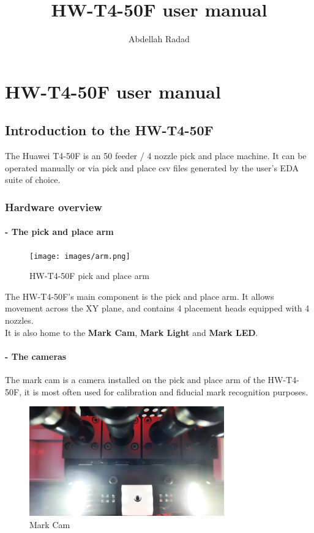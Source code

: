 \documentclass[a4paper,10pt]{report}
\title{HW-T4-50F user manual}
\author{Abdellah Radad}
\begin{document}

\newpage
\tableofcontents
\newpage
\listoffigures
\newpage
\chapter{HW-T4-50F user manual}
\newpage
\section{Introduction to the HW-T4-50F}
The Huawei T4-50F is an 50 feeder / 4 nozzle pick and place machine. It can be operated manually or via pick and place csv files generated by the user's EDA suite of choice.\\
\subsection{Hardware overview}
\subsubsection{- The pick and place arm}
\begin{figure}[!htb]
 \centering
 \texttt{[image: images/arm.png]}
 \caption{HW-T4-50F pick and place arm}
\end{figure}
The HW-T4-50F's main component is the pick and place arm. It allows movement across the XY plane, and contains 4 placement heads equipped with 4 nozzles.\\
It is also home to the \textbf{Mark Cam}, \textbf{Mark Light} and \textbf{Mark LED}.
\newpage
\subsubsection{- The cameras}
The mark cam is a camera installed on the pick and place arm of the HW-T4-50F, it is most often used for calibration and fiducial mark recognition purposes.\\
\begin{figure}[!htb]
 \centering
 \includegraphics[width=0.75\textwidth]{images/mcam.jpg}
 \caption{Mark Cam}
\end{figure}
\end{document}
